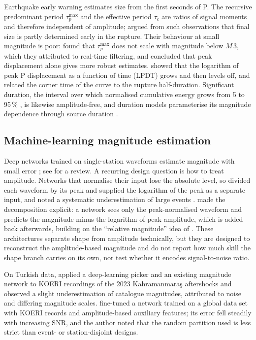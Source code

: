 \documentclass[11pt,a4paper]{article}
\begin{document}
Earthquake early warning estimates size from the first seconds of P. The
recursive predominant period $\tau_p^{\max}$ \citep{allen2003} and the
effective period $\tau_c$ \citep{kanamori2005,wu2005} are ratios of signal
moments and therefore independent of amplitude; \citet{olson2005} argued
from such observations that final size is partly determined early in the
rupture. Their behaviour at small magnitude is poor:
\citet{kuyuk2013} found that $\tau_p^{\max}$ does not scale with magnitude
below $M\,3$, which they attributed to real-time filtering, and concluded
that peak displacement alone gives more robust estimates.
\citet{colombelli2015} showed that the logarithm of peak P displacement as
a function of time (LPDT) grows and then levels off, and related the
corner time of the curve to the rupture half-duration. Significant
duration, the interval over which normalised cumulative energy grows from
5 to 95\,\% \citep{trifunac1975}, is likewise amplitude-free, and duration
models parameterise its magnitude dependence through source duration
\citep{afshari2016}.

\subsection{Machine-learning magnitude estimation}
Deep networks trained on single-station waveforms estimate magnitude with
small error \citep{mousavi2020,lomax2019}; see \citet{mousavi2023} for a
review. A recurring design question is how to treat amplitude. Networks
that normalise their input lose the absolute level, so
\citet{munchmeyer2021b} divided each waveform by its peak and supplied the
logarithm of the peak as a separate input, and noted a systematic
underestimation of large events \citep[see also][]{munchmeyer2021}.
\citet{zhang2026} made the decomposition explicit: a network sees only the
peak-normalised waveform and predicts the magnitude minus the logarithm of
peak amplitude, which is added back afterwards, building on the
``relative magnitude'' idea of \citet{zhang2024}. These architectures
separate shape from amplitude technically, but they are designed to
reconstruct the amplitude-based magnitude and do not report how much skill
the shape branch carries on its own, nor test whether it encodes
signal-to-noise ratio.

On Turkish data, \citet{li2024} applied a deep-learning picker and an
existing magnitude network to KOERI recordings of the 2023
Kahramanma\-ra\c{s} aftershocks and observed a slight underestimation of
catalogue magnitudes, attributed to noise and differing magnitude scales.
\citet{celik2026} fine-tuned a network trained on a global data set with
KOERI records and amplitude-based auxiliary features; its error fell
steadily with increasing SNR, and the author noted that the random
partition used is less strict than event- or station-disjoint designs.
\end{document}
